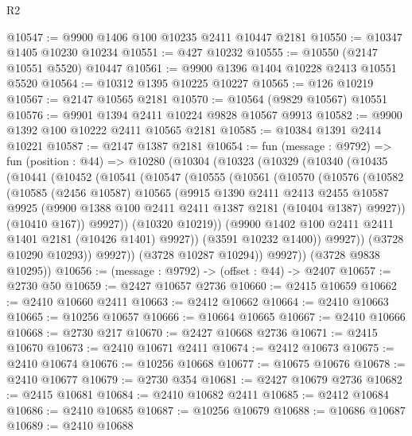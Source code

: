 \begin{lexlean}{R2}
\begin{coremodule}
@10547 := @9900 @1406 @100 @10235 @2411 @10447 @2181
@10550 := @10347 @1405 @10230 @10234
@10551 := @427 @10232
@10555 := @10550 (@2147 @10551 @5520) @10447
@10561 := @9900 @1396 @1404 @10228 @2413 @10551 @5520
@10564 := @10312 @1395 @10225 @10227
@10565 := @126 @10219
@10567 := @2147 @10565 @2181
@10570 := @10564 (@9829 @10567) @10551
@10576 := @9901 @1394 @2411 @10224 @9828 @10567 @9913
@10582 := @9900 @1392 @100 @10222 @2411 @10565 @2181
@10585 := @10384 @1391 @2414 @10221
@10587 := @2147 @1387 @2181
@10654 := fun (message : @9792) =>
  fun (position : @44) =>
  @10280
    (@10304
      (@10323
        (@10329
          (@10340
            (@10435
              (@10441
                (@10452
                  (@10541
                    (@10547
                      (@10555
                        (@10561
                          (@10570
                            (@10576
                              (@10582
                                (@10585
                                  (@2456 @10587)
                                  @10565
                                  (@9915
                                    @1390
                                    @2411
                                    @2413
                                    @2455
                                    @10587
                                    @9925
                                    (@9900 @1388 @100 @2411 @2411 @1387 @2181 (@10404 @1387) @9927))
                                  (@10410 @167))
                                @9927))
                            (@10320 @10219))
                          (@9900 @1402 @100 @2411 @2411 @1401 @2181 (@10426 @1401) @9927))
                        (@3591 @10232 @1400))
                      @9927))
                  (@3728 @10290 @10293))
                @9927))
            (@3728 @10287 @10294))
          @9927))
      (@3728 @9838 @10295))
@10656 := (message : @9792) -> (offset : @44) -> @2407
@10657 := @2730 @50
@10659 := @2427 @10657 @2736
@10660 := @2415 @10659
@10662 := @2410 @10660 @2411
@10663 := @2412 @10662
@10664 := @2410 @10663
@10665 := @10256 @10657
@10666 := @10664 @10665
@10667 := @2410 @10666
@10668 := @2730 @217
@10670 := @2427 @10668 @2736
@10671 := @2415 @10670
@10673 := @2410 @10671 @2411
@10674 := @2412 @10673
@10675 := @2410 @10674
@10676 := @10256 @10668
@10677 := @10675 @10676
@10678 := @2410 @10677
@10679 := @2730 @354
@10681 := @2427 @10679 @2736
@10682 := @2415 @10681
@10684 := @2410 @10682 @2411
@10685 := @2412 @10684
@10686 := @2410 @10685
@10687 := @10256 @10679
@10688 := @10686 @10687
@10689 := @2410 @10688

\end{coremodule}
\end{lexlean}
